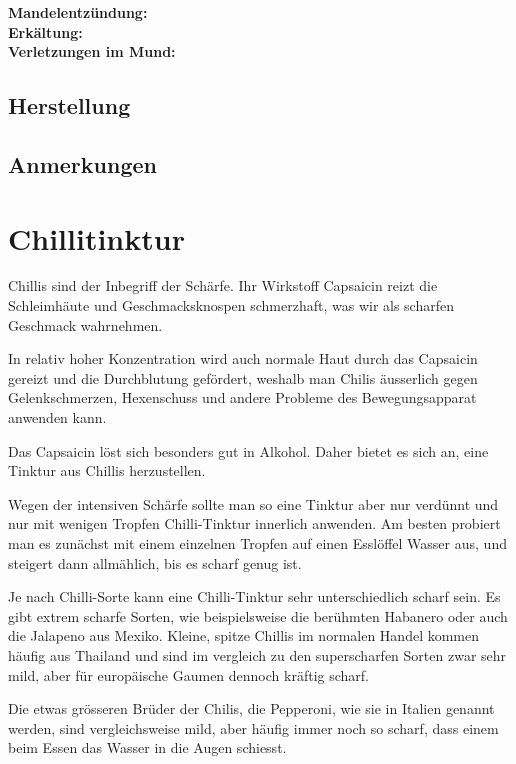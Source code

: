 \textbf{Mandelentzündung:} \\

\textbf{Erkältung:} \\ 

\textbf{Verletzungen im Mund:} \\


\subsection{Herstellung}

\subsection{Anmerkungen}






\section{Chillitinktur}

Chillis sind der Inbegriff der Schärfe. Ihr Wirkstoff Capsaicin reizt die Schleimhäute und Geschmacksknospen schmerzhaft, was wir als scharfen Geschmack wahrnehmen.

In relativ hoher Konzentration wird auch normale Haut durch das Capsaicin gereizt und die Durchblutung gefördert, weshalb man Chilis äusserlich gegen Gelenkschmerzen, Hexenschuss und andere Probleme des Bewegungsapparat anwenden kann.

Das Capsaicin löst sich besonders gut in Alkohol. Daher bietet es sich an, eine Tinktur aus Chillis herzustellen.

Wegen der intensiven Schärfe sollte man so eine Tinktur aber nur verdünnt und nur mit wenigen Tropfen Chilli-Tinktur innerlich anwenden. Am besten probiert man es zunächst mit einem einzelnen Tropfen auf einen Esslöffel Wasser aus, und steigert dann allmählich, bis es scharf genug ist.

Je nach Chilli-Sorte kann eine Chilli-Tinktur sehr unterschiedlich scharf sein. Es gibt extrem scharfe Sorten, wie beispielsweise die berühmten Habanero oder auch die Jalapeno aus Mexiko. Kleine, spitze Chillis im normalen Handel kommen häufig aus Thailand und sind im vergleich zu den superscharfen Sorten zwar sehr mild, aber für europäische Gaumen dennoch kräftig scharf.

Die etwas grösseren Brüder der Chilis, die Pepperoni, wie sie in Italien genannt werden, sind vergleichsweise mild, aber häufig immer noch so scharf, dass einem beim Essen das Wasser in die Augen schiesst.

